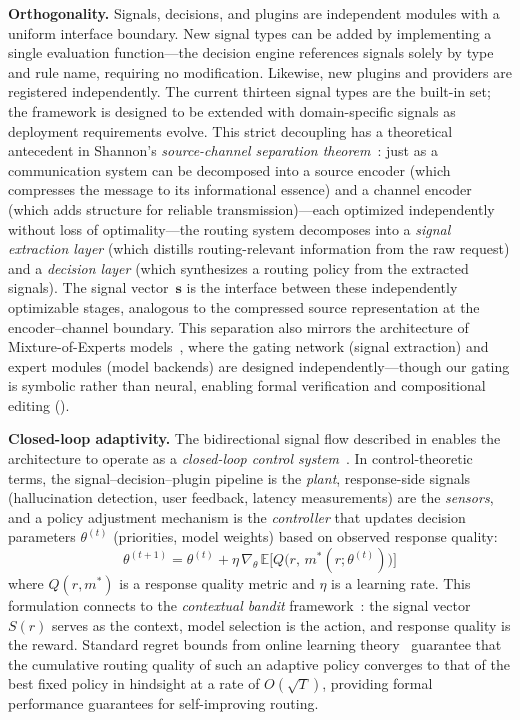 \noindent\textbf{Orthogonality.}
Signals, decisions, and plugins are independent modules with a uniform interface boundary.
New signal types can be added by implementing a single evaluation function---the decision engine references signals solely by type and rule name, requiring no modification.
Likewise, new plugins and providers are registered independently.
The current thirteen signal types are the built-in set; the framework is designed to be extended with domain-specific signals as deployment requirements evolve.
This strict decoupling has a theoretical antecedent in Shannon's \emph{source-channel separation theorem}~\cite{shannon1948mathematical}: just as a communication system can be decomposed into a source encoder (which compresses the message to its informational essence) and a channel encoder (which adds structure for reliable transmission)---each optimized independently without loss of optimality---the routing system decomposes into a \emph{signal extraction layer} (which distills routing-relevant information from the raw request) and a \emph{decision layer} (which synthesizes a routing policy from the extracted signals).
The signal vector~$\mathbf{s}$ is the interface between these independently optimizable stages, analogous to the compressed source representation at the encoder--channel boundary.
This separation also mirrors the architecture of Mixture-of-Experts models~\cite{shazeer2017moe}, where the gating network (signal extraction) and expert modules (model backends) are designed independently---though our gating is symbolic rather than neural, enabling formal verification and compositional editing ().

\noindent\textbf{Closed-loop adaptivity.}
The bidirectional signal flow described in  enables the architecture to operate as a \emph{closed-loop control system}~\cite{astrom2008feedback}.
In control-theoretic terms, the signal--decision--plugin pipeline is the \emph{plant}, response-side signals (hallucination detection, user feedback, latency measurements) are the \emph{sensors}, and a policy adjustment mechanism is the \emph{controller} that updates decision parameters $\theta^{(t)}$ (priorities, model weights) based on observed response quality:
\begin{equation}
  \theta^{(t+1)} = \theta^{(t)} + \eta \,\nabla_\theta\, \mathbb{E}\bigl[Q\bigl(r,\, m^*(r;\theta^{(t)})\bigr)\bigr]
\end{equation}
where $Q(r, m^*)$ is a response quality metric and $\eta$ is a learning rate.
This formulation connects to the \emph{contextual bandit} framework~\cite{li2010contextual}: the signal vector $S(r)$ serves as the context, model selection is the action, and response quality is the reward.
Standard regret bounds from online learning theory~\cite{shalev2012online} guarantee that the cumulative routing quality of such an adaptive policy converges to that of the best fixed policy in hindsight at a rate of $O(\sqrt{T})$, providing formal performance guarantees for self-improving routing.

